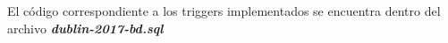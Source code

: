 El código correspondiente a los triggers implementados se encuentra dentro del archivo \mbox{\textbf{\textit{dublin-2017-bd.sql}}}